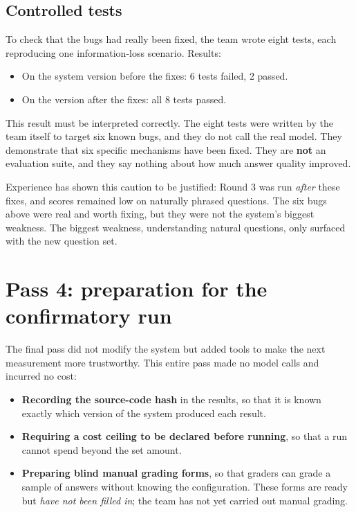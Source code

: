 \subsection{Controlled tests}

To check that the bugs had really been fixed, the team wrote eight tests, each reproducing one information-loss scenario. Results:

\begin{itemize}
    \item On the system version before the fixes: 6 tests failed, 2 passed.
    \item On the version after the fixes: all 8 tests passed.
\end{itemize}

This result must be interpreted correctly. The eight tests were written by the team itself to target six known bugs, and they do not call the real model. They demonstrate that six specific mechanisms have been fixed. They are \textbf{not} an evaluation suite, and they say nothing about how much answer quality improved.

Experience has shown this caution to be justified: Round 3 was run \emph{after} these fixes, and scores remained low on naturally phrased questions. The six bugs above were real and worth fixing, but they were not the system's biggest weakness. The biggest weakness, understanding natural questions, only surfaced with the new question set.

\section{Pass 4: preparation for the confirmatory run}

The final pass did not modify the system but added tools to make the next measurement more trustworthy. This entire pass made no model calls and incurred no cost:

\begin{itemize}
    \item \textbf{Recording the source-code hash} in the results, so that it is known exactly which version of the system produced each result.
    \item \textbf{Requiring a cost ceiling to be declared before running}, so that a run cannot spend beyond the set amount.
    \item \textbf{Preparing blind manual grading forms}, so that graders can grade a sample of answers without knowing the configuration. These forms are ready but \emph{have not been filled in}; the team has not yet carried out manual grading.
\end{itemize}

